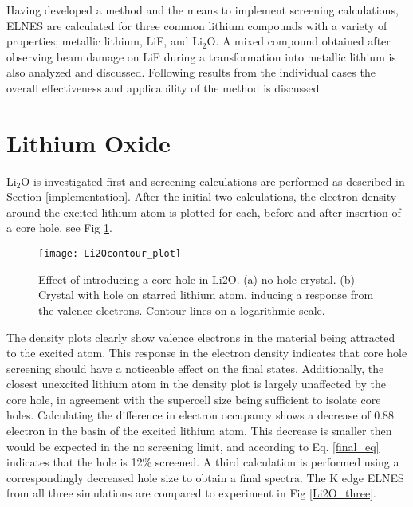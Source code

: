 
Having developed a method and the means to implement screening calculations, ELNES are calculated for three common lithium compounds with a variety of properties; metallic lithium, LiF, and  $\mathrm{Li_2O}$.  A mixed compound obtained after observing beam damage on LiF during a transformation into metallic lithium is also analyzed and discussed.  Following results from the individual cases the overall effectiveness and applicability of the method is discussed.




\section{Lithium Oxide}

 $ \mathrm{Li_2O} $ is investigated first and screening calculations are performed as described in Section \ref{implementation}.   After the initial two calculations, the electron density around the excited lithium atom is plotted for each, before and after insertion of a core hole, see Fig \ref{Li2O_contour}.  \\

\begin{figure}
	\centering
	\texttt{[image: Li2Ocontour\_plot]}
	\caption{Effect of introducing a core hole in $ \mathrm{Li2O} $.  (a) no hole crystal.  (b) Crystal with hole on starred lithium atom, inducing a response from the valence electrons.  Contour lines on a logarithmic scale. }
	\label{Li2O_contour}
\end{figure}

The density plots clearly show valence electrons in the material being attracted to the excited atom. This response in the electron density indicates that core hole screening should have a noticeable effect on the final states.  Additionally, the closest unexcited lithium atom in the density plot is largely unaffected by the core hole, in agreement with the supercell size being sufficient to isolate core holes.  Calculating the difference in electron occupancy shows a decrease of 0.88 electron in the basin of the excited lithium atom.  This decrease is smaller then would be expected in the no screening limit, and according to Eq. \ref{final_eq} indicates that the hole is 12\% screened.  A third calculation is performed using a correspondingly decreased hole size to obtain a final spectra.  The K edge ELNES from all three simulations are compared to experiment in Fig \ref{Li2O_three}.  \\

